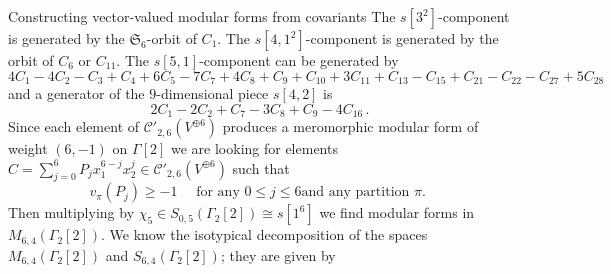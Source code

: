 \documentclass[12pt]{amsart}
\numberwithin{equation}{section}
\numberwithin{equation}{section}
\theoremstyle{definition}
\theoremstyle{remark}
\begin{document}
\begin{section}{Constructing vector-valued modular forms from covariants}
The $s[3^2]$-component 
 is generated by the $\mathfrak{S}_6$-orbit of $C_1$.
The $s[4,1^2]$-component is generated by the orbit of $C_6$ or $C_{11}$.
The $s[5,1]$-component can be generated by
$$
4C_1-4C_2-C_3+C_4+6C_5-7C_7+4C_8+C_9+C_{10}+3C_{11}+C_{13}-C_{15}+C_{21}-C_{22}-C_{27}+5C_{28}
$$
and a generator of the $9$-dimensional piece $s[4,2]$ is 
$$
2C_1-2C_2+C_7-3C_8+C_9-4C_{16}\, .
$$
Since each element of $\mathcal{C}'_{2,6}(V^{\oplus 6})$ produces a 
meromorphic modular form of weight $(6,-1)$ on $\Gamma[2]$ we are 
looking for elements $C=\sum_{j=0}^6 P_jx_1^{6-j}x_2^j \in 
\mathcal{C}'_{2,6}(V^{\oplus 6})$ such that
\[
v_{\pi}(P_j)\geqslant -1 \quad \text{ for any $0\leqslant j \leqslant 6$
and any partition $\pi$. }
\]
Then multiplying by $\chi_5\in S_{0,5}(\Gamma_2[2])\cong s[1^6]$ 
we find modular forms in $M_{6,4}(\Gamma_2[2])$.
We know the isotypical decomposition of the spaces 
$M_{6,4}(\Gamma_2[2])$ and $S_{6,4}(\Gamma_2[2])$; they are given by


\end{section}
\end{document}
